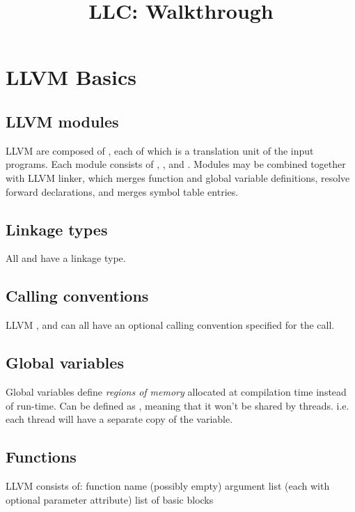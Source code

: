 \documentclass{myproc}
\begin{document}
\small
\title{LLC: Walkthrough}
\date{}
\maketitle


\tableofcontents

\section{LLVM Basics}
\subsection{LLVM modules}
\bit
\w LLVM  are composed of , each of which is a
translation unit of the input programs. Each module consists of
, , and . 
\w Modules may be combined together with LLVM linker, which merges function
and global variable definitions, resolve forward declarations, and merges
symbol table entries. 
\eit
\subsection{Linkage types}
\bit
\w All  and  have a linkage type.
\eit
\subsection{Calling conventions}
\bit
\w LLVM ,  and  can all have an optional
calling convention specified for the call.
\eit

\subsection{Global variables}
\bit
\w Global variables define {\em regions of memory\/} allocated at compilation
time instead of run-time. 
\w Can be defined as , meaning that it won't be shared by
threads. i.e. each thread will have a separate copy of the variable.
\eit

\subsection{Functions}
\bit
\w LLVM  consists of:
  \bit
  \w function name 
  \w (possibly empty) argument list (each with optional parameter attribute)
  \w list of basic blocks
  \eit
\eit
\end{document}

